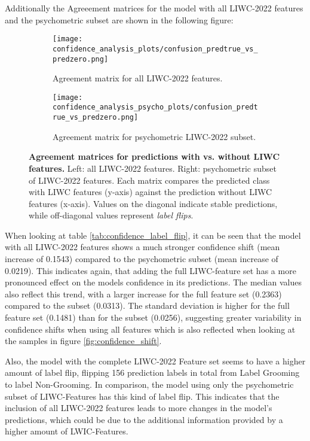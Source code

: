 Additionally the Agreeement matrices for the model with all LIWC-2022 features and the psychometric subset are shown in the following figure: 
\begin{figure}[H]
  \centering

  \begin{subfigure}[t]{0.49\textwidth}
    \centering
    \texttt{[image: confidence\_analysis\_plots/confusion\_predtrue\_vs\_predzero.png]}
    \caption{Agreement matrix for all LIWC-2022 features.}
    \label{fig:agreement_all}
  \end{subfigure}\hfill
  \begin{subfigure}[t]{0.49\textwidth}
    \centering
    \texttt{[image: confidence\_analysis\_psycho\_plots/confusion\_predtrue\_vs\_predzero.png]}
    \caption{Agreement matrix for psychometric LIWC-2022 subset.}
    \label{fig:agreement_psycho}
  \end{subfigure}

  \caption[Agreement matrices for predictions with vs. without LIWC features.]{\textbf{Agreement matrices for predictions with vs. without LIWC features.} 
  Left: all LIWC-2022 features. Right: psychometric subset of LIWC-2022 features. 
  Each matrix compares the predicted class with LIWC features (y-axis) against the prediction without LIWC features (x-axis). 
  Values on the diagonal indicate stable predictions, while off-diagonal values represent \emph{label flips}.}
  \label{fig:agreement_combined}
\end{figure}

When looking at table \ref{tab:confidence_label_flip}, it can be seen that the model with all LIWC-2022 features shows a much stronger confidence shift (mean increase of 0.1543) compared to the psychometric subset (mean increase of 0.0219). This indicates again, that adding the full LIWC-feature set has a more pronounced effect on the models confidence in its predictions. The median values also reflect this trend, with a larger increase for the full feature set (0.2363) compared to the subset (0.0313). The standard deviation is higher for the full feature set (0.1481) than for the subset (0.0256), suggesting greater variability in confidence shifts when using all features which is also reflected when looking at the samples in figure \ref{fig:confidence_shift}. 

Also, the model with the complete LIWC-2022 Feature set seems to have a higher amount of label flip, flipping 156 prediction labels in total from Label Grooming to label Non-Grooming. In comparison, the model using only the psychometric subset of LIWC-Features has this kind of label flip. This indicates that the inclusion of all LIWC-2022 features leads to more changes in the model's predictions, which could be due to the additional information provided by a higher amount of LWIC-Features.

